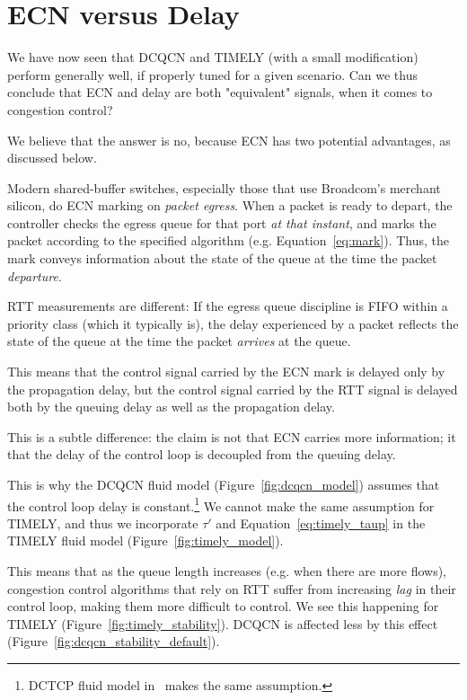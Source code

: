 \vspace{-1em}
\section {ECN versus Delay}
\label{sec:discuss}

We have now seen that DCQCN and TIMELY (with a small modification) perform
generally well, if properly tuned for a given scenario. Can we thus conclude
that ECN and delay are both "equivalent" signals, when it comes to congestion
control? 

We believe that the answer is no, because ECN has two potential advantages, as
discussed below.

Modern shared-buffer switches, especially those that use Broadcom's merchant
silicon, do ECN marking on {\em packet egress}. When a packet is ready to
depart, the controller checks the egress queue for that port {\em at that
instant}, and marks the packet according to the specified algorithm
(e.g.  Equation~\ref{eq:mark}). Thus, the mark conveys information about the
state of the queue at the time the packet {\em departure}.

RTT measurements are different: If the egress queue discipline is FIFO within a
priority class (which it typically is), the delay experienced by a packet
reflects the state of the queue at the time the packet {\em arrives} at the
queue. 

This means that the control signal carried by the ECN mark is delayed only by
the propagation delay, but the control signal carried by the RTT signal is
delayed both by the queuing delay as well as the propagation delay. 

This is a subtle difference: the claim is not that ECN carries more information;
it that the delay of the control loop is decoupled from the queuing delay.

This is why the DCQCN fluid model (Figure~\ref{fig:dcqcn_model}) assumes that
the control loop delay is constant.\footnote{DCTCP fluid model
in~\cite{dctcp-analysis} makes the same assumption.} We cannot make the same
assumption for TIMELY, and  thus we incorporate $\tau'$ and
Equation~\ref{eq:timely_taup} in the TIMELY fluid model
(Figure~\ref{fig:timely_model}).

This means that as the queue length increases (e.g. when there are more flows),
congestion control algorithms that rely on RTT suffer from increasing {\em lag}
in their control loop, making them more difficult to control. We see this
happening for TIMELY (Figure~\ref{fig:timely_stability}). DCQCN is affected less
by  this effect (Figure~\ref{fig:dcqcn_stability_default}).

